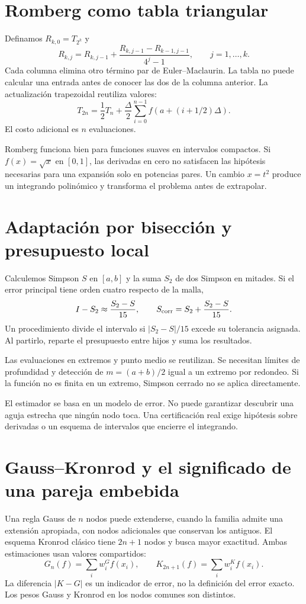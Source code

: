 \documentclass[11pt,a4paper]{article}
\theoremstyle{definition}
\newcounter{problema}
\begin{document}
\section{Romberg como tabla triangular}
Definamos $R_{k,0}=T_{2^k}$ y
\[
R_{k,j}=R_{k,j-1}+
\frac{R_{k,j-1}-R_{k-1,j-1}}{4^j-1},
\qquad j=1,\ldots,k.
\]
Cada columna elimina otro término par de Euler--Maclaurin. La tabla no puede calcular una entrada antes de conocer las dos de la columna anterior. La actualización trapezoidal reutiliza valores:
\[
T_{2n}=\frac12T_n+\frac{\Delta}2
\sum_{i=0}^{n-1}f(a+(i+1/2)\Delta).
\]
El costo adicional es $n$ evaluaciones.

Romberg funciona bien para funciones suaves en intervalos compactos. Si $f(x)=\sqrt x$ en $[0,1]$, las derivadas en cero no satisfacen las hipótesis necesarias para una expansión solo en potencias pares. Un cambio $x=t^2$ produce un integrando polinómico y transforma el problema antes de extrapolar.

\section{Adaptación por bisección y presupuesto local}
Calculemos Simpson $S$ en $[a,b]$ y la suma $S_2$ de dos Simpson en mitades. Si el error principal tiene orden cuatro respecto de la malla,
\[
I-S_2\approx\frac{S_2-S}{15},\qquad
S_{\rm corr}=S_2+\frac{S_2-S}{15}.
\]
Un procedimiento divide el intervalo si $|S_2-S|/15$ excede su tolerancia asignada. Al partirlo, reparte el presupuesto entre hijos y suma los resultados.

Las evaluaciones en extremos y punto medio se reutilizan. Se necesitan límites de profundidad y detección de $m=(a+b)/2$ igual a un extremo por redondeo. Si la función no es finita en un extremo, Simpson cerrado no se aplica directamente.

El estimador se basa en un modelo de error. No puede garantizar descubrir una aguja estrecha que ningún nodo toca. Una certificación real exige hipótesis sobre derivadas o un esquema de intervalos que encierre el integrando.

\section{Gauss--Kronrod y el significado de una pareja embebida}
Una regla Gauss de $n$ nodos puede extenderse, cuando la familia admite una extensión apropiada, con nodos adicionales que conservan los antiguos. El esquema Kronrod clásico tiene $2n+1$ nodos y busca mayor exactitud. Ambas estimaciones usan valores compartidos:
\[
G_n(f)=\sum_iw_i^{G}f(x_i),\qquad
K_{2n+1}(f)=\sum_iw_i^{K}f(x_i).
\]
La diferencia $|K-G|$ es un indicador de error, no la definición del error exacto. Los pesos Gauss y Kronrod en los nodos comunes son distintos.
\end{document}
